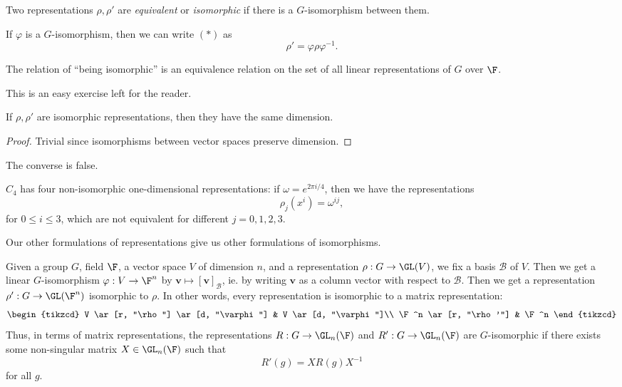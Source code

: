 \documentclass[a4paper]{article}
\begin{document}
\begin{defi}
  Two representations $\rho, \rho'$ are \emph{equivalent} or \emph{isomorphic} if there is a $G$-isomorphism between them.
\end{defi}

If $\varphi$ is a $G$-isomorphism, then we can write $(*)$ as
\[
  \rho' = \varphi \rho \varphi^{-1}.\tag{$\dagger$}
\]
\begin{lemma}
  The relation of ``being isomorphic'' is an equivalence relation on the set of all linear representations of $G$ over $\F$.
\end{lemma}
This is an easy exercise left for the reader.

\begin{lemma}
  If $\rho, \rho'$ are isomorphic representations, then they have the same dimension.
\end{lemma}

\begin{proof}
  Trivial since isomorphisms between vector spaces preserve dimension.
\end{proof}

The converse is false.
\begin{eg}
  $C_4$ has four non-isomorphic one-dimensional representations: if $\omega = e^{2 \pi i/4}$, then we have the representations
  \[
    \rho_j (x^i) = \omega^{ij},
  \]
  for $0 \leq i \leq 3$, which are not equivalent for different $j = 0, 1, 2, 3$.
\end{eg}
Our other formulations of representations give us other formulations of isomorphisms.

Given a group $G$, field $\F$, a vector space $V$ of dimension $n$, and a representation $\rho: G \to \GL(V)$, we fix a basis $\mathcal{B}$ of $V$. Then we get a linear $G$-isomorphism $\varphi: V \to \F^n$ by $\mathbf{v} \mapsto [\mathbf{v}]_{\mathcal{B}}$, ie. by writing $\mathbf{v}$ as a column vector with respect to $\mathcal{B}$. Then we get a representation $\rho': G \to \GL(\F^n)$ isomorphic to $\rho$. In other words, every representation is isomorphic to a matrix representation:
\[
  \begin{tikzcd}
    V \ar[r, "\rho"] \ar[d, "\varphi"] & V \ar[d, "\varphi"]\\
    \F^n \ar[r, "\rho'"] & \F^n
  \end{tikzcd}
\]
Thus, in terms of matrix representations, the representations $R: G \to \GL_n(\F)$ and $R': G \to \GL_n(\F)$ are $G$-isomorphic if there exists some non-singular matrix $X \in \GL_n(\F)$ such that
\[
  R'(g) = X R(g) X^{-1}
\]
for all $g$.
\end{document}
